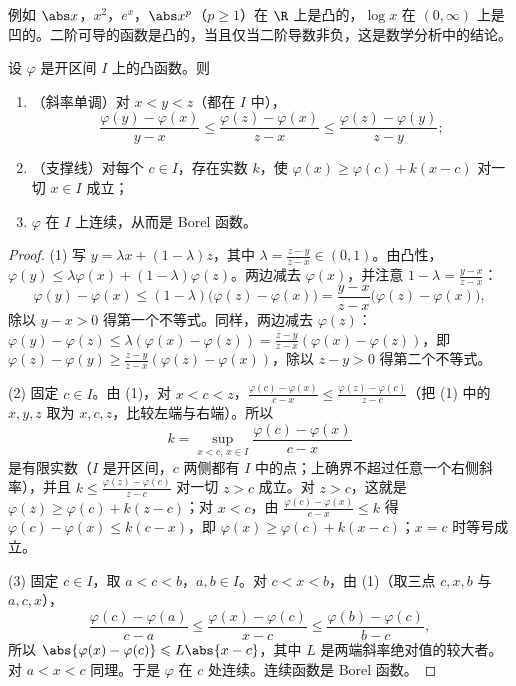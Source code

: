 例如 $\abs x$，$x^2$，$e^x$，$\abs x^p$（$p\geqslant1$）在 $\R$ 上是凸的，$\log x$ 在 $(0,\infty)$ 上是凹的。二阶可导的函数是凸的，当且仅当二阶导数非负，这是数学分析中的结论。

\begin{lemma}[凸函数的支撑线]\label{lem:expectation:supporting-line}
设 $\varphi$ 是开区间 $I$ 上的凸函数。则
\begin{enumerate}
\item （斜率单调）对 $x<y<z$（都在 $I$ 中），
\[
\frac{\varphi(y)-\varphi(x)}{y-x}\leqslant\frac{\varphi(z)-\varphi(x)}{z-x}\leqslant\frac{\varphi(z)-\varphi(y)}{z-y};
\]
\item （支撑线）对每个 $c\in I$，存在实数 $k$，使 $\varphi(x)\geqslant\varphi(c)+k(x-c)$ 对一切 $x\in I$ 成立；
\item $\varphi$ 在 $I$ 上连续，从而是 Borel 函数。
\end{enumerate}
\end{lemma}
\begin{proof}
(1) 写 $y=\lambda x+(1-\lambda)z$，其中 $\lambda=\frac{z-y}{z-x}\in(0,1)$。由凸性，$\varphi(y)\leqslant\lambda\varphi(x)+(1-\lambda)\varphi(z)$。两边减去 $\varphi(x)$，并注意 $1-\lambda=\frac{y-x}{z-x}$：
\[
\varphi(y)-\varphi(x)\leqslant(1-\lambda)\bigl(\varphi(z)-\varphi(x)\bigr)=\frac{y-x}{z-x}\bigl(\varphi(z)-\varphi(x)\bigr),
\]
除以 $y-x>0$ 得第一个不等式。同样，两边减去 $\varphi(z)$：$\varphi(y)-\varphi(z)\leqslant\lambda(\varphi(x)-\varphi(z))=\frac{z-y}{z-x}(\varphi(x)-\varphi(z))$，即 $\varphi(z)-\varphi(y)\geqslant\frac{z-y}{z-x}(\varphi(z)-\varphi(x))$，除以 $z-y>0$ 得第二个不等式。

(2) 固定 $c\in I$。由 (1)，对 $x<c<z$，$\frac{\varphi(c)-\varphi(x)}{c-x}\leqslant\frac{\varphi(z)-\varphi(c)}{z-c}$（把 (1) 中的 $x,y,z$ 取为 $x,c,z$，比较左端与右端）。所以
\[
k=\sup_{x<c,\,x\in I}\frac{\varphi(c)-\varphi(x)}{c-x}
\]
是有限实数（$I$ 是开区间，$c$ 两侧都有 $I$ 中的点；上确界不超过任意一个右侧斜率），并且 $k\leqslant\frac{\varphi(z)-\varphi(c)}{z-c}$ 对一切 $z>c$ 成立。对 $z>c$，这就是 $\varphi(z)\geqslant\varphi(c)+k(z-c)$；对 $x<c$，由 $\frac{\varphi(c)-\varphi(x)}{c-x}\leqslant k$ 得 $\varphi(c)-\varphi(x)\leqslant k(c-x)$，即 $\varphi(x)\geqslant\varphi(c)+k(x-c)$；$x=c$ 时等号成立。

(3) 固定 $c\in I$，取 $a<c<b$，$a,b\in I$。对 $c<x<b$，由 (1)（取三点 $c,x,b$ 与 $a,c,x$），
\[
\frac{\varphi(c)-\varphi(a)}{c-a}\leqslant\frac{\varphi(x)-\varphi(c)}{x-c}\leqslant\frac{\varphi(b)-\varphi(c)}{b-c},
\]
所以 $\abs{\varphi(x)-\varphi(c)}\leqslant L\abs{x-c}$，其中 $L$ 是两端斜率绝对值的较大者。对 $a<x<c$ 同理。于是 $\varphi$ 在 $c$ 处连续。连续函数是 Borel 函数。
\end{proof}

